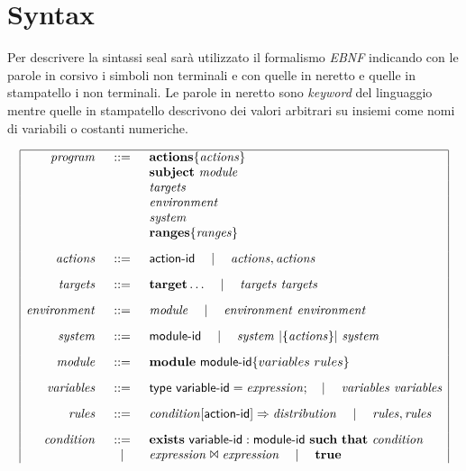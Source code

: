 \chapter{Syntax}
Per descrivere la sintassi \ac{seal} sarà utilizzato il formalismo \emph{EBNF} indicando con le parole in corsivo i simboli non terminali e con quelle in neretto e quelle in stampatello i non terminali. Le parole in neretto sono \emph{keyword} del linguaggio mentre quelle in stampatello descrivono dei valori arbitrari su insiemi come nomi di variabili o costanti numeriche.

\begin{table} %
$$
\begin{array}{|rcl|}
\hline
\mathit{program} &::=& \mathbf{actions} \{ \mathit{actions} \} \\
	&& \mathbf{subject} \Space \mathit{module} \\
	&& \mathit{targets} \\
	&& \mathit{environment} \\
	&& \mathit{system} \\
	&& \mathbf{ranges} \{ \mathit{ranges} \}
	\\[.3cm]
\mathit{actions} &::=& \x{action}\textrm{-}\x{id} \Sep \mathit{actions} , \mathit{actions}
	\\[.3cm]
\mathit{targets} &::=& \mathbf{target} \dots \Sep \mathit{targets} \Space \mathit{targets}
	\\[.3cm]
\mathit{environment} &::=& \mathit{module} \Sep \mathit{environment} \Space \mathit{environment}
	\\[.3cm]
\mathit{system} &::=& \x{module}\textrm{-}\x{id} \Sep \mathit{system} \Par{\{\mathit{actions}\}} \mathit{system}
	\\[.3cm]
\mathit{module} &::=& \mathbf{module} \Space \x{module}\textrm{-}\x{id} \{ variables \Space rules \}
	\\[.3cm]
\mathit{variables} &::=& \x{type} \Space \x{variable}\textrm{-}\x{id} = \mathit{expression}; \Sep \mathit{variables} \Space \mathit{variables}
	\\[.3cm]
\mathit{rules} &::=& \mathit{condition} [ \x{action}\textrm{-}\x{id}]\Rightarrow \mathit{distribution} \Sep \mathit{rules},\mathit{rules}
	\\[.3cm]
\mathit{condition} &::=& \mathbf{exists} \Space \x{variable}\textrm{-}\x{id}:\x{module}\textrm{-}\x{id} \Space \mathbf{such}\Space\mathbf{that} \Space \mathit{condition} \\
	& \Sep & \mathit{expression} \Join \mathit{expression} \Sep \mathbf{true} \\

\end{array}$$
\end{table}
